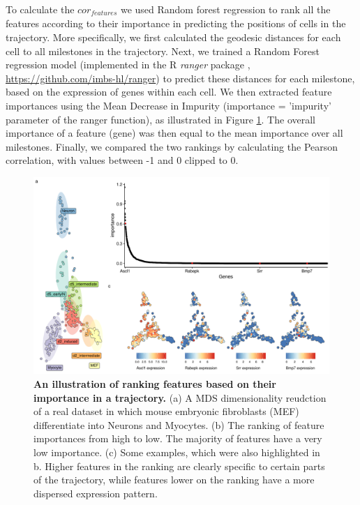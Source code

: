 To calculate the $\textit{cor}_{\textit{features}}$ we used Random forest regression to rank all the features according to their importance in predicting the positions of cells in the trajectory. More specifically, we first calculated the geodesic distances for each cell to all milestones in the trajectory. Next, we trained a Random Forest regression model (implemented in the R \textit{ranger} package \cite{wright_rangerfastimplementation_2017}, \href{https://github.com/imbs-hl/ranger}{https://github.com/imbs-hl/ranger}) to predict these distances for each milestone, based on the expression of genes within each cell. We then extracted feature importances using the Mean Decrease in Impurity (importance = 'impurity' parameter of the ranger function), as illustrated in Figure \ref{fig:snote1fig_8}. The overall importance of a feature (gene) was then equal to the mean importance over all milestones. Finally, we compared the two rankings by calculating the Pearson correlation, with values between -1 and 0 clipped to 0.

\begin{figure}[tbh!]
	\centering\includegraphics[width=\linewidth]{fig/snote1fig_8.pdf}
	\caption{
		\textbf{An illustration of ranking features based on their importance in a trajectory.} 
		(a) A MDS dimensionality reudction of a real dataset in which mouse embryonic fibroblasts (MEF) differentiate into Neurons and Myocytes. (b) The ranking of feature importances from high to low. The majority of features have a very low importance. (c) Some examples, which were also highlighted in b. Higher features in the ranking are clearly specific to certain parts of the trajectory, while features lower on the ranking have a more dispersed expression pattern.
	}
	\label{fig:snote1fig_8}
\end{figure}

